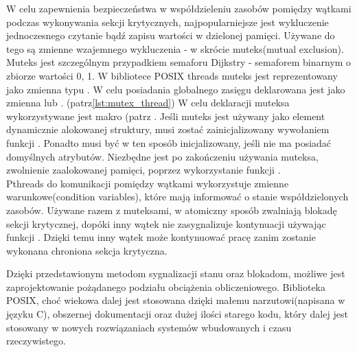 \documentclass[document.tex]{subfiles}
\begin{document}
\indent W celu zapewnienia bezpieczeństwa w współdzieleniu zasobów
pomiędzy wątkami podczas wykonywania sekcji krytycznych,
najpopularniejsze jest wykluczenie jednoczesnego czytanie bądź zapisu
wartości w dzielonej pamięci. Używane do tego są zmienne wzajemnego
wykluczenia - w skrócie muteks(mutual exclusion). Muteks jest szczególnym przypadkiem semaforu Dijkstry - semaforem binarnym 
o zbiorze wartości {0, 1}.\cite{POSIX_Butenhof}\cite{POSIX_tutorial}\cite{POSIX_article} 
W bibliotece POSIX threads muteks jest reprezentowany jako zmienna typu . W celu posiadania globalnego
zasięgu deklarowana jest jako zmienna  lub .
\cite{POSIX_Butenhof}\cite{C_King}(patrz\ref{lst:mutex_thread})
W celu deklaracji muteksa wykorzystywane jest makro (patrz . Jeśli muteks jest używany jako
element dynamicznie alokowanej struktury, musi zostać zainicjalizowany 
wywołaniem funkcji . Ponadto musi być w ten
sposób inicjalizowany, jeśli nie ma posiadać domyślnych atrybutów.
Niezbędne jest po zakończeniu używania muteksa, zwolnienie zaalokowanej pamięci, poprzez wykorzystanie funkcji .\cite{POSIX_Butenhof} 
\\


\indent Pthreads do komunikacji pomiędzy wątkami wykorzystuje zmienne
warunkowe(condition variables), które mają informować o stanie 
współdzielonych zasobów. Używane razem z muteksami, w atomiczny 
sposób zwalniają blokadę sekcji krytycznej, dopóki inny wątek nie
zasygnalizuje kontynuacji używając funkcji . Dzięki temu inny wątek może kontynuować pracę 
zanim zostanie wykonana chroniona sekcja krytyczna.

\indent Dzięki przedstawionym metodom sygnalizacji stanu oraz 
blokadom, możliwe jest zaprojektowanie pożądanego podziału obciążenia
obliczeniowego. Biblioteka POSIX, choć wiekowa dalej jest stosowana
dzięki małemu narzutowi(napisana w języku C), obszernej dokumentacji 
oraz dużej ilości starego kodu, który dalej jest stosowany w nowych
rozwiązaniach systemów wbudowanych i czasu rzeczywistego.\cite{POSIX_tutorial}
\clearpage
\end{document}
